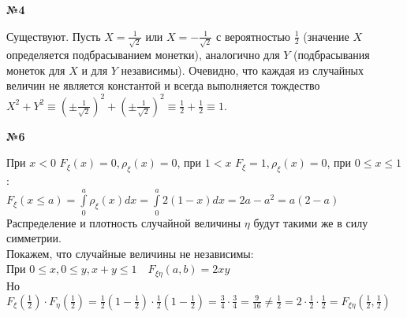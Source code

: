 \documentclass{article}
\newenvironment{task}{\begin{center}\fontsize{14}{14}\selectfont\bf}{\rm\fontsize{12}{12}\selectfont\end{center}}
\begin{document}
	
	
	\begin{task} 
		№4
	\end{task}
	Существуют. Пусть $X = \frac{1}{\sqrt{2}}$ или $X = - \frac{1}{\sqrt{2}}$ с вероятностью $\frac{1}{2}$ (значение $X$ определяется подбрасыванием монетки), аналогично для $Y$ (подбрасывания монеток для $X$ и для $Y$ независимы). Очевидно, что каждая из случайных величин не является константой и всегда выполняется тождество $X^2 + Y^2 \equiv \left(\pm\frac{1}{\sqrt{2}}\right)^2 + \left(\pm\frac{1}{\sqrt{2}}\right)^2 \equiv \frac{1}{2} + \frac{1}{2} \equiv 1$. 
	
	
	
	\begin{task} 
		№6
	\end{task}
	\begin{center}
		При $x < 0$ $F_\xi(x) = 0, \rho_\xi(x) = 0$, при $1 < x$ $F_\xi = 1, \rho_\xi(x) = 0$, при $0 \leq x \leq 1$: \\
		$F_\xi(x \leq a) = \int\limits_{0}^{a} \rho_\xi(x)dx = \int\limits_{0}^{a} 2(1 - x)dx = 2a - a^2 = a(2 - a)$\\
		Распределение и плотность случайной величины $\eta$ будут такими же в силу симметрии.\\
		Покажем, что случайные величины не независимы:\\
		При $0 \leq x, 0 \leq y, x + y \leq 1\quad F_{\xi\eta}(a, b) = 2xy$\\
		Но $F_\xi(\frac{1}{2})\cdot F_\eta(\frac{1}{2}) = \frac{1}{2}(1 - \frac{1}{2})\cdot \frac{1}{2}(1 - \frac{1}{2}) = \frac{3}{4}\cdot \frac{3}{4} = \frac{9}{16} \not= \frac{1}{2} = 2\cdot\frac{1}{2}\cdot\frac{1}{2} = F_{\xi\eta}(\frac{1}{2}, \frac{1}{2})$
	\end{center}
	
	
\end{document}
